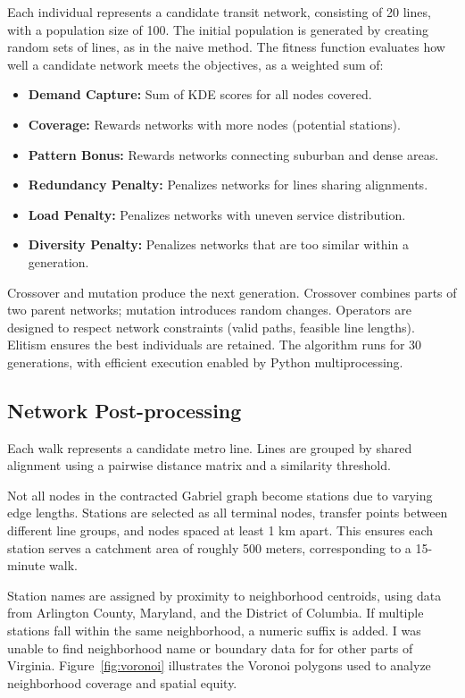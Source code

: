 \documentclass[sigconf,nonacm]{acmart}
\begin{document}
Each individual represents a candidate transit network, consisting of 20 lines, with a population size of 100. The initial population is generated by creating random sets of lines, as in the naive method. The fitness function evaluates how well a candidate network meets the objectives, as a weighted sum of:
\begin{itemize}
    \item \textbf{Demand Capture:} Sum of KDE scores for all nodes covered.
    \item \textbf{Coverage:} Rewards networks with more nodes (potential stations).
    \item \textbf{Pattern Bonus:} Rewards networks connecting suburban and dense areas.
    \item \textbf{Redundancy Penalty:} Penalizes networks for lines sharing alignments.
    \item \textbf{Load Penalty:} Penalizes networks with uneven service distribution.
    \item \textbf{Diversity Penalty:} Penalizes networks that are too similar within a generation.
\end{itemize}

Crossover and mutation produce the next generation. Crossover combines parts of two parent networks; mutation introduces random changes. Operators are designed to respect network constraints (valid paths, feasible line lengths). Elitism ensures the best individuals are retained. The algorithm runs for 30 generations, with efficient execution enabled by Python multiprocessing.

\subsection{Network Post-processing}
Each walk represents a candidate metro line. Lines are grouped by shared alignment using a pairwise distance matrix and a similarity threshold.

Not all nodes in the contracted Gabriel graph become stations due to varying edge lengths. Stations are selected as all terminal nodes, transfer points between different line groups, and nodes spaced at least 1 km apart. This ensures each station serves a catchment area of roughly 500 meters, corresponding to a 15-minute walk.

Station names are assigned by proximity to neighborhood centroids, using data from Arlington County, Maryland, and the District of Columbia. If multiple stations fall within the same neighborhood, a numeric suffix is added. I was unable to find neighborhood name or boundary data for for other parts of Virginia. Figure~\ref{fig:voronoi} illustrates the Voronoi polygons used to analyze neighborhood coverage and spatial equity.
\end{document}

